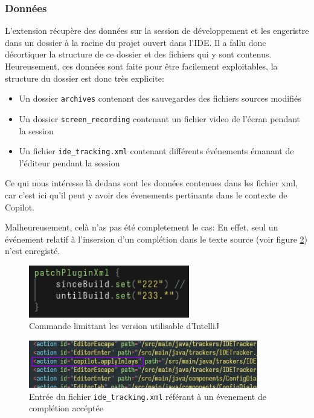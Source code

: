 \subsubsection{Données}

L'extension récupère des données sur la session de développement et les engeristre dans un dossier à la racine du projet ouvert dans l'IDE.
Il a fallu donc décortiquer la structure de ce dossier et des fichiers qui y sont contenus. Heureusement, ces données sont faite pour être facilement exploitables, la structure du dossier est donc très explicite:

\begin{itemize}
	\item Un dossier \lstinline{archives} contenant des sauvegardes des fichiers sources modifiés
	\item Un dossier \lstinline{screen_recording} contenant un fichier video de l'écran pendant la session
	\item Un fichier \lstinline{ide_tracking.xml} contenant différents événements émanant de l'éditeur pendant la session
\end{itemize}

Ce qui nous intéresse là dedans sont les données contenues dans les fichier xml, car c'est ici qu'il peut y avoir des évenements pertinants dans le contexte de Copilot.

Malheureusement, celà n'as pas été completement le cas: En effet, seul un événement relatif à l'insersion d'un complétion dans le texte source
(voir figure \ref{apply-inlay-action}) n'est enregisté.

\begin{figure}
	\centering
	\includegraphics[width=7cm]{images/codegrits-wrong-version.png}
	\caption{Commande limittant les version utilisable d'IntelliJ}
	\label{codegrits-old-build-version}
\end{figure}

\begin{figure}
	\centering
	\includegraphics[width=10cm]{images/apply-inlay-action.png}
	\caption{Entrée du fichier \lstinline{ide_tracking.xml} référant à un évenement de complétion accéptée}
	\label{apply-inlay-action}
\end{figure}


